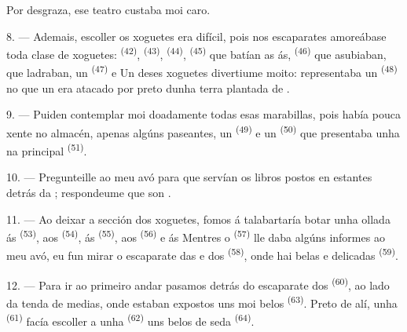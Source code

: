 Por desgraza, ese teatro custaba moi caro.

8. --- Ademais, escoller os xoguetes era difícil, pois nos escaparates amoreábase toda
clase de xoguetes:  \textsuperscript{(42)}, 
\textsuperscript{(43)},  \textsuperscript{(44)}, 
\textsuperscript{(45)} que batían as ás,  \textsuperscript{(46)} que
asubiaban,  que ladraban, un 
\textsuperscript{(47)} e  Un deses xoguetes divertiume
moito: representaba un  \textsuperscript{(48)} no que un
 era atacado por  preto dunha terra plantada de
.


9. --- Puiden contemplar moi doadamente todas esas marabillas, pois había pouca xente
no almacén, apenas algúns paseantes, un  \textsuperscript{(49)} e un
 \textsuperscript{(50)} que presentaba unha 
na  principal \textsuperscript{(51)}.

10. --- Pregunteille ao meu avó para que servían os libros postos en estantes detrás da
; respondeume que son .

\VUsaut{3.6mm}
\VUsaut{2.8mm}

11. --- Ao deixar a sección dos xoguetes, fomos á talabartaría botar unha ollada ás
 \textsuperscript{(53)}, aos  \textsuperscript{(54)},
ás  \textsuperscript{(55)}, aos 
\textsuperscript{(56)} e ás  Mentres o 
\textsuperscript{(57)} lle daba algúns informes ao meu avó, eu fun mirar o escaparate
das  e dos  \textsuperscript{(58)}, onde hai belas
 e delicadas  \textsuperscript{(59)}.

12. --- Para ir ao primeiro andar pasamos detrás do escaparate dos 
\textsuperscript{(60)}, ao lado da tenda de medias, onde estaban expostos uns
 moi belos \textsuperscript{(63)}. Preto de alí, unha
 \textsuperscript{(61)} facía escoller a unha 
\textsuperscript{(62)} uns belos  de seda \textsuperscript{(64)}.

